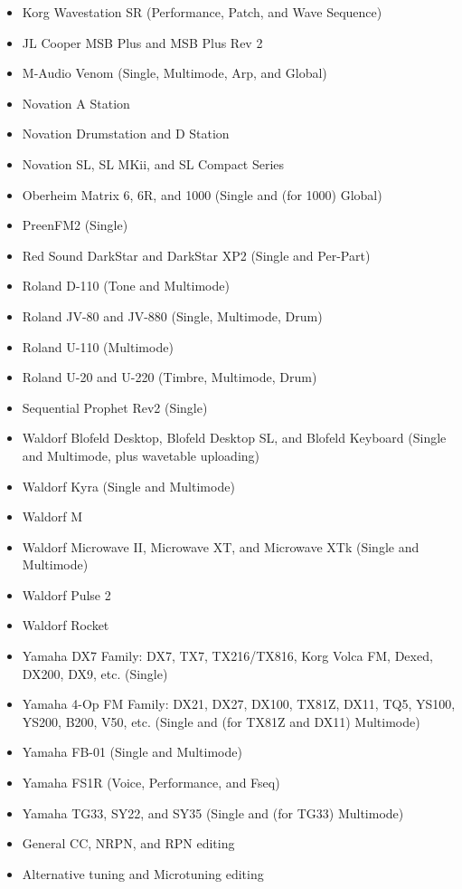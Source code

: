 \documentclass{article}
\begin{document}
{\begin{multicols}{2}
\begin{flushleft}
\begin{itemize}
\item Korg Wavestation SR (Performance, Patch, and Wave Sequence)
\item JL Cooper MSB Plus and MSB Plus Rev 2
\item M-Audio Venom (Single, Multimode, Arp, and Global)
\item Novation A Station
\item Novation Drumstation and D Station
\item Novation SL, SL MKii, and SL Compact Series
\item Oberheim Matrix 6, 6R, and 1000 (Single and (for 1000) Global)
\item PreenFM2 (Single)
\item Red Sound DarkStar and DarkStar XP2 (Single and Per-Part)
\item Roland D-110 (Tone and Multimode)
\item Roland JV-80 and JV-880 (Single, Multimode, Drum)
\item Roland U-110 (Multimode)
\item Roland U-20 and U-220 (Timbre, Multimode, Drum)
\item Sequential Prophet Rev2 (Single)
\item Waldorf Blofeld Desktop, Blofeld Desktop SL, and Blofeld Keyboard (Single and Multimode, plus wavetable uploading)
\item Waldorf Kyra (Single and Multimode)
\item Waldorf M
\item Waldorf Microwave II, Microwave XT, and Microwave XTk (Single and Multimode)
\item Waldorf Pulse 2
\item Waldorf Rocket
\item Yamaha DX7 Family: DX7, TX7, TX216/TX816, Korg Volca FM, Dexed, DX200, DX9, etc. (Single)
\item Yamaha 4-Op FM Family: DX21, DX27, DX100, TX81Z, DX11, TQ5, YS100, YS200, B200, V50, etc. (Single and  (for TX81Z and DX11) Multimode)
\item Yamaha FB-01 (Single and Multimode)
\item Yamaha FS1R (Voice, Performance, and Fseq)
\item Yamaha TG33, SY22, and SY35 (Single and (for TG33) Multimode)
\item General CC, NRPN, and RPN editing
\item Alternative tuning and Microtuning editing
\end{itemize}
\end{flushleft}
\end{multicols}
}
\end{document}
